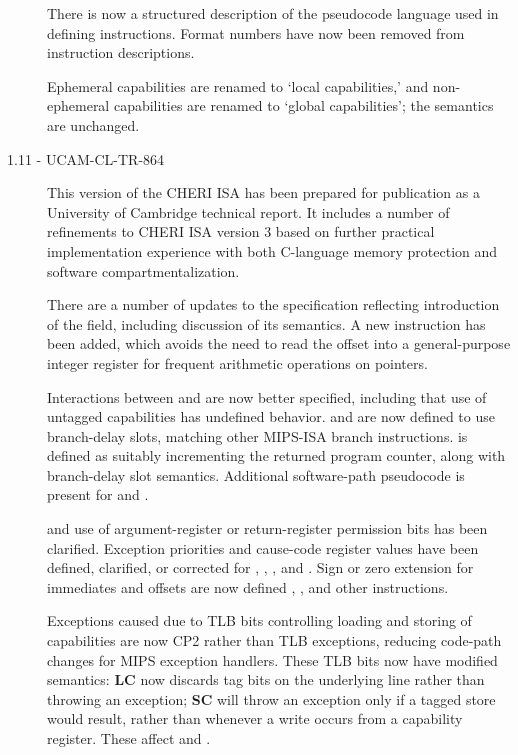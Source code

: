 \begin{description}
  There is now a structured description of the pseudocode language used in
  defining instructions.
  Format numbers have now been removed from instruction descriptions.

  Ephemeral capabilities are renamed to `local capabilities,' and
  non-ephemeral capabilities are renamed to `global capabilities'; the
  semantics are unchanged.

\item[1.11 - UCAM-CL-TR-864]
  This version of the CHERI ISA has been prepared for publication as a
  University of Cambridge technical report.
  It includes a number of refinements to CHERI ISA version 3 based on further
  practical implementation experience with both C-language memory protection
  and software compartmentalization.

  There are a number of updates to the specification reflecting introduction
  of the \coffset{} field, including discussion of its semantics.
  A new  instruction has been added, which avoids the
  need to read the offset into a general-purpose integer register for frequent
  arithmetic operations on pointers.
   
  Interactions between \EPC{} and \EPCC{} are now better specified, including
    that use of untagged capabilities has undefined behavior.
   and  are now defined to use
    branch-delay slots, matching other MIPS-ISA branch instructions.
   is defined as suitably incrementing the returned
    program counter, along with branch-delay slot semantics.
  Additional software-path pseudocode is present for  and
    .

   and  use of argument-register
    or return-register permission bits has been clarified.
  Exception priorities and cause-code register values have been defined,
    clarified, or corrected for ,
  , , and .
  Sign or zero extension for immediates and offsets are now defined
    , ,
    and other instructions.

  Exceptions caused due to TLB bits controlling loading and storing of
    capabilities are now CP2 rather than TLB exceptions, reducing code-path
    changes for MIPS exception handlers.
  These TLB bits now have modified semantics: {\bf LC} now discards tag bits
    on the underlying line rather than throwing an exception; {\bf SC} will
    throw an exception only if a tagged store would result, rather than
    whenever a write occurs from a capability register.
  These affect  and .


\end{description}

